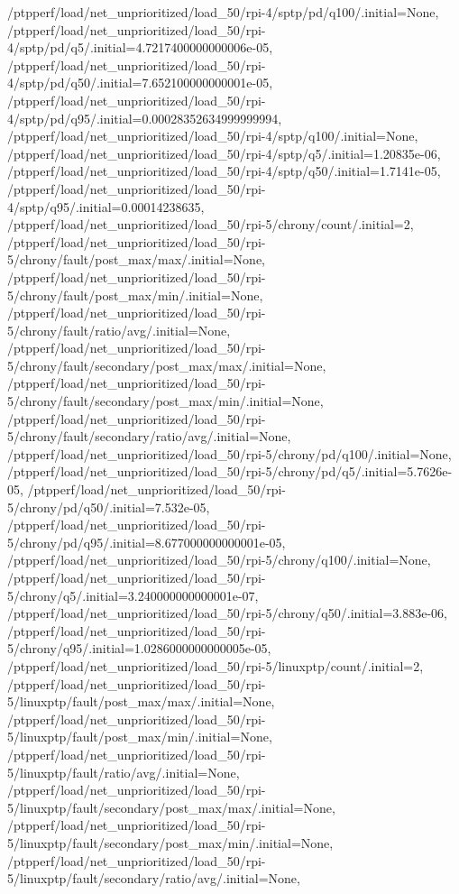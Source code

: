 {    /ptpperf/load/net_unprioritized/load_50/rpi-4/sptp/pd/q100/.initial=None,
    /ptpperf/load/net_unprioritized/load_50/rpi-4/sptp/pd/q5/.initial=4.7217400000000006e-05,
    /ptpperf/load/net_unprioritized/load_50/rpi-4/sptp/pd/q50/.initial=7.652100000000001e-05,
    /ptpperf/load/net_unprioritized/load_50/rpi-4/sptp/pd/q95/.initial=0.00028352634999999994,
    /ptpperf/load/net_unprioritized/load_50/rpi-4/sptp/q100/.initial=None,
    /ptpperf/load/net_unprioritized/load_50/rpi-4/sptp/q5/.initial=1.20835e-06,
    /ptpperf/load/net_unprioritized/load_50/rpi-4/sptp/q50/.initial=1.7141e-05,
    /ptpperf/load/net_unprioritized/load_50/rpi-4/sptp/q95/.initial=0.00014238635,
    /ptpperf/load/net_unprioritized/load_50/rpi-5/chrony/count/.initial=2,
    /ptpperf/load/net_unprioritized/load_50/rpi-5/chrony/fault/post_max/max/.initial=None,
    /ptpperf/load/net_unprioritized/load_50/rpi-5/chrony/fault/post_max/min/.initial=None,
    /ptpperf/load/net_unprioritized/load_50/rpi-5/chrony/fault/ratio/avg/.initial=None,
    /ptpperf/load/net_unprioritized/load_50/rpi-5/chrony/fault/secondary/post_max/max/.initial=None,
    /ptpperf/load/net_unprioritized/load_50/rpi-5/chrony/fault/secondary/post_max/min/.initial=None,
    /ptpperf/load/net_unprioritized/load_50/rpi-5/chrony/fault/secondary/ratio/avg/.initial=None,
    /ptpperf/load/net_unprioritized/load_50/rpi-5/chrony/pd/q100/.initial=None,
    /ptpperf/load/net_unprioritized/load_50/rpi-5/chrony/pd/q5/.initial=5.7626e-05,
    /ptpperf/load/net_unprioritized/load_50/rpi-5/chrony/pd/q50/.initial=7.532e-05,
    /ptpperf/load/net_unprioritized/load_50/rpi-5/chrony/pd/q95/.initial=8.677000000000001e-05,
    /ptpperf/load/net_unprioritized/load_50/rpi-5/chrony/q100/.initial=None,
    /ptpperf/load/net_unprioritized/load_50/rpi-5/chrony/q5/.initial=3.240000000000001e-07,
    /ptpperf/load/net_unprioritized/load_50/rpi-5/chrony/q50/.initial=3.883e-06,
    /ptpperf/load/net_unprioritized/load_50/rpi-5/chrony/q95/.initial=1.0286000000000005e-05,
    /ptpperf/load/net_unprioritized/load_50/rpi-5/linuxptp/count/.initial=2,
    /ptpperf/load/net_unprioritized/load_50/rpi-5/linuxptp/fault/post_max/max/.initial=None,
    /ptpperf/load/net_unprioritized/load_50/rpi-5/linuxptp/fault/post_max/min/.initial=None,
    /ptpperf/load/net_unprioritized/load_50/rpi-5/linuxptp/fault/ratio/avg/.initial=None,
    /ptpperf/load/net_unprioritized/load_50/rpi-5/linuxptp/fault/secondary/post_max/max/.initial=None,
    /ptpperf/load/net_unprioritized/load_50/rpi-5/linuxptp/fault/secondary/post_max/min/.initial=None,
    /ptpperf/load/net_unprioritized/load_50/rpi-5/linuxptp/fault/secondary/ratio/avg/.initial=None,
}
